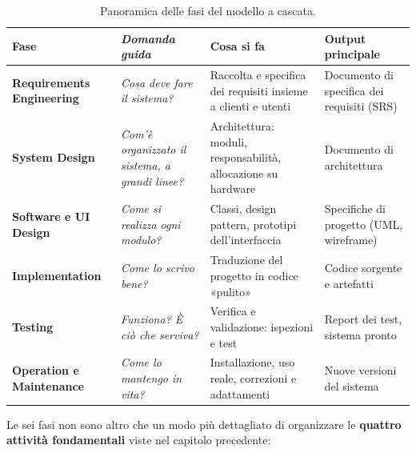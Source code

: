 \begin{table}[H]
\centering
\renewcommand{\arraystretch}{1.45}
\begin{tabularx}{\textwidth}{>{\bfseries}P{3.0cm} >{\itshape}P{3.6cm} L P{3.3cm}}
\toprule
Fase & Domanda guida & Cosa si fa & Output principale \\
\midrule
\textcolor{ph1}{Requirements Engineering} & Cosa deve fare il sistema? & Raccolta e specifica dei requisiti insieme a clienti e utenti & Documento di specifica dei requisiti (SRS) \\
\textcolor{ph2}{System Design} & Com'è organizzato il sistema, a grandi linee? & Architettura: moduli, responsabilità, allocazione su hardware & Documento di architettura \\
\textcolor{ph3}{Software e UI Design} & Come si realizza ogni modulo? & Classi, design pattern, prototipi dell'interfaccia & Specifiche di progetto (UML, wireframe) \\
\textcolor{ph4}{Implementation} & Come lo scrivo bene? & Traduzione del progetto in codice «pulito» & Codice sorgente e artefatti \\
\textcolor{ph5}{Testing} & Funziona? È ciò che serviva? & Verifica e validazione: ispezioni e test & Report dei test, sistema pronto \\
\textcolor{ph6}{Operation e Maintenance} & Come lo mantengo in vita? & Installazione, uso reale, correzioni e adattamenti & Nuove versioni del sistema \\
\bottomrule
\end{tabularx}
\caption{Panoramica delle fasi del modello a cascata.}
\end{table}

Le sei fasi non sono altro che un modo più dettagliato di organizzare le \textbf{quattro attività fondamentali}
viste nel capitolo precedente:

